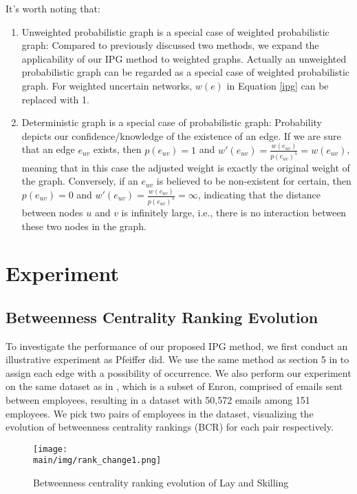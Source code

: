 \documentclass[\main/thesis.tex]{subfiles}
\begin{document}
It's worth noting that:
\begin{enumerate}
\item Unweighted probabilistic graph is a special case of weighted probabilistic graph: Compared to previously discussed two methods, we expand the applicability of our IPG method to weighted graphs. Actually an unweighted probabilistic graph can be regarded as a special case of weighted probabilistic graph. For weighted uncertain networks, $w(e)$ in Equation \ref{ipg} can be replaced with 1.
\item Deterministic graph is a special case of probabilistic graph: Probability depicts our confidence/knowledge of the existence of an edge. If we are sure that an edge $e_{uv}$ exists, then $p(e_{uv}) = 1$ and $w'(e_{uv}) = \frac{w(e_{uv})}{p(e_{uv})^\lambda } = w(e_{uv})$, meaning that in this case the adjusted weight is exactly the original weight of the graph. Conversely, if an $e_{uv}$ is believed to be non-existent for certain, then $p(e_{uv}) = 0$ and $w'(e_{uv}) = \frac{w(e_{uv})}{p(e_{uv})^\lambda } = \infty$, indicating that the distance between nodes $u$ and $v$ is infinitely large, i.e., there is no interaction between these two nodes in the graph.
\end{enumerate}

\section{Experiment}
\subsection{Betweenness Centrality Ranking Evolution}
To investigate the performance of our proposed IPG method, we first conduct an illustrative experiment as Pfeiffer \cite{pfeiffer2010probabilistic,pfeiffer2011methods} did. We use the same method as section 5 in \cite{pfeiffer2010probabilistic} to assign each edge with a possibility of occurrence. We also perform our experiment on the same dataset as in \cite{pfeiffer2010probabilistic,pfeiffer2011methods}, which is a subset of Enron, comprised of emails sent between employees, resulting in a dataset with 50,572 emails among 151 employees. We pick two pairs of employees in the dataset, visualizing the evolution of betweenness centrality rankings (BCR) for each pair respectively. 
\begin{figure}
\centering
\texttt{[image: \\main/img/rank\_change1.png]}
\caption{Betweenness centrality ranking evolution of Lay and Skilling}
\label{rank_change1}
\end{figure}
\end{document}
